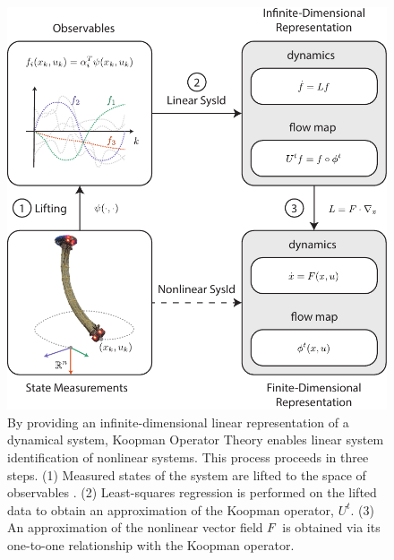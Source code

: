 \begin{figure}[t]
    \centering
    \includegraphics[width=\linewidth]{figures/overviewDiagram_wNumbers.pdf}
    \caption{ 
    By providing an infinite-dimensional linear representation of a dynamical system, Koopman Operator Theory enables linear system identification of nonlinear systems. 
    This process proceeds in three steps.
    (1) Measured states of the system are lifted to the space of observables .
    (2) Least-squares regression is performed on the lifted data to obtain an approximation of the Koopman operator, $U^t$.
    (3) An approximation of the nonlinear vector field $F$ is obtained via its one-to-one relationship with the Koopman operator.}
    \label{fig:overview}
\end{figure}


